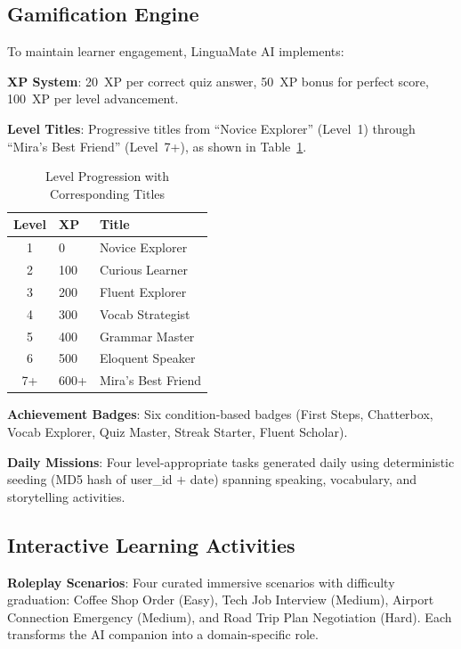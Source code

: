 \documentclass[conference]{IEEEtran}
\begin{document}
\subsection{Gamification Engine}

To maintain learner engagement, LinguaMate AI implements:

\textbf{XP System}: 20~XP per correct quiz answer, 50~XP bonus for perfect score, 100~XP per level advancement.

\textbf{Level Titles}: Progressive titles from ``Novice Explorer'' (Level~1) through ``Mira's Best Friend'' (Level~7+), as shown in Table~\ref{tab:levels}.

\begin{table}[htbp]
\caption{Level Progression with Corresponding Titles}
\label{tab:levels}
\centering
\begin{tabular}{@{}cll@{}}
\toprule
\textbf{Level} & \textbf{XP} & \textbf{Title} \\
\midrule
1 & 0 & Novice Explorer \\
2 & 100 & Curious Learner \\
3 & 200 & Fluent Explorer \\
4 & 300 & Vocab Strategist \\
5 & 400 & Grammar Master \\
6 & 500 & Eloquent Speaker \\
7+ & 600+ & Mira's Best Friend \\
\bottomrule
\end{tabular}
\end{table}

\textbf{Achievement Badges}: Six condition-based badges (First Steps, Chatterbox, Vocab Explorer, Quiz Master, Streak Starter, Fluent Scholar).

\textbf{Daily Missions}: Four level-appropriate tasks generated daily using deterministic seeding (MD5 hash of user\_id $+$ date) spanning speaking, vocabulary, and storytelling activities.

\subsection{Interactive Learning Activities}

\textbf{Roleplay Scenarios}: Four curated immersive scenarios with difficulty graduation: Coffee Shop Order (Easy), Tech Job Interview (Medium), Airport Connection Emergency (Medium), and Road Trip Plan Negotiation (Hard). Each transforms the AI companion into a domain-specific role.
\end{document}
